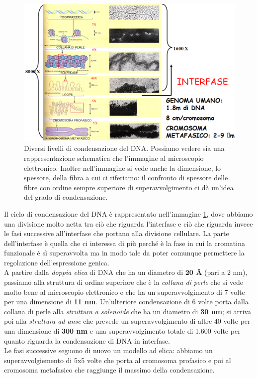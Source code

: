 \documentclass[11pt]{book}
\begin{document}
\begin{figure}[h!]
\centering
\includegraphics[scale=0.70]{img/22_cromatina.png}
\caption{Diversi livelli di condensazione del DNA. Possiamo vedere sia una rappresentazione schematica che l’immagine al microscopio elettronico. Inoltre nell’immagine si vede anche la dimensione, lo spessore, della fibra a cui ci riferiamo: il confronto di spessore delle fibre con ordine sempre superiore di superavvolgimento ci dà un’idea del grado di condensazione.}
\label{livelli_condensazione}
\end{figure}

Il ciclo di condensazione del DNA è rappresentato nell’immagine \ref{livelli_condensazione}, dove abbiamo una divisione molto netta tra ciò che riguarda l’interfase e ciò che riguarda invece le fasi successive all'interfase che portano alla divisione cellulare. La parte dell’interfase è quella che ci interessa di più perché è la fase in cui la cromatina funzionale è sì superavvolta ma in modo tale da poter comunque permettere la regolazione dell’espressione genica.\\
A partire dalla \emph{doppia elica} di DNA che ha un diametro di \textbf{20 \si{\angstrom}} (pari a 2 nm), passiamo alla struttura di ordine superiore che è la \emph{collana di perle} che si vede molto bene al microscopio elettronico e che ha un superavvolgimento di 7 volte per una dimensione di \textbf{11 nm}. Un’ulteriore condensazione di 6 volte porta dalla collana di perle alla \emph{struttura a solenoide} che ha un diametro di \textbf{30 nm}; si arriva poi alla \emph{struttura ad anse} che prevede un superavvolgimento di altre 40 volte per una dimensione di \textbf{300 nm} e una superavvolgimento totale di 1.600 volte per quanto riguarda la condensazione di DNA in interfase.\\
Le fasi successive seguono di nuovo un modello ad elica: abbiamo un superavvolgiemento di 5x5 volte che porta al cromosoma profasico e poi al cromosoma metafasico che raggiunge il massimo della condensazione.
\end{document}
